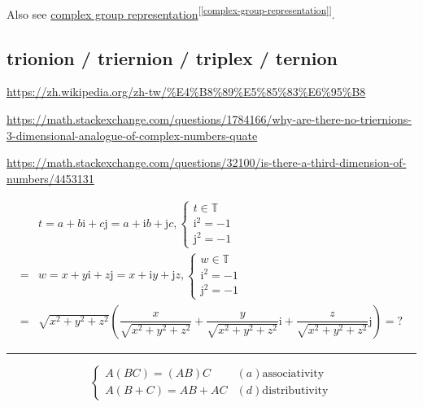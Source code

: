 \documentclass[
]{book}
\theoremstyle{definition}
\theoremstyle{definition}
\theoremstyle{definition}
\theoremstyle{definition}
\theoremstyle{remark}
\begin{document}
Also see \hyperref[complex-group-representation]{complex group representation}\textsuperscript{{[}\ref{complex-group-representation}{]}}.

\subsection{trionion / triernion / triplex / ternion}\label{trionion-triernion-triplex-ternion}

\url{https://zh.wikipedia.org/zh-tw/\%E4\%B8\%89\%E5\%85\%83\%E6\%95\%B8}

\url{https://math.stackexchange.com/questions/1784166/why-are-there-no-triernions-3-dimensional-analogue-of-complex-numbers-quate}

\url{https://math.stackexchange.com/questions/32100/is-there-a-third-dimension-of-numbers/4453131}

\[
\begin{aligned}
 & t=a+b\mathrm{i}+c\mathrm{j}=a+\mathrm{i}b+\mathrm{j}c,\begin{cases}
t\in\mathbb{T}\\
\mathrm{i}^{2}=-1\\
\mathrm{j}^{2}=-1
\end{cases}\\
= & w=x+y\mathrm{i}+z\mathrm{j}=x+\mathrm{i}y+\mathrm{j}z,\begin{cases}
w\in\mathbb{T}\\
\mathrm{i}^{2}=-1\\
\mathrm{j}^{2}=-1
\end{cases}\\
= & \sqrt{x^{2}+y^{2}+z^{2}}\left(\dfrac{x}{\sqrt{x^{2}+y^{2}+z^{2}}}+\dfrac{y}{\sqrt{x^{2}+y^{2}+z^{2}}}\mathrm{i}+\dfrac{z}{\sqrt{x^{2}+y^{2}+z^{2}}}\mathrm{j}\right)=?
\end{aligned}
\]

\begin{center}\rule{0.5\linewidth}{0.5pt}\end{center}

\[
\begin{cases}
A\left(BC\right)=\left(AB\right)C & \left(a\right)\text{associativity}\\
A\left(B+C\right)=AB+AC & \left(d\right)\text{distributivity}
\end{cases}
\]
\end{document}
